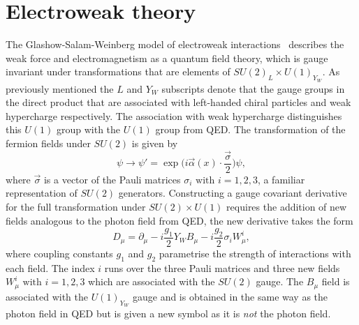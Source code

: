 \section{Electroweak theory}

The Glashow-Salam-Weinberg model of electroweak interactions~\cite{Glashow:1959,
Salam:1959, Weinberg:1967} describes the weak force and electromagnetism as a
quantum field theory, which is gauge invariant under transformations that are
elements of $SU{(2)}_{L} \times U{(1)}_{Y_{W}}$. As previously mentioned the $L$
and $Y_{W}$ subscripts denote that the gauge groups in the direct product that
are associated with left-handed chiral particles and weak hypercharge
respectively. The association with weak hypercharge distinguishes this $U(1)$
group with the $U(1)$ group from QED. The transformation of the fermion fields
under $SU(2)$ is given by
\begin{equation}
  \label{eq:su2-trans} \psi \rightarrow \psi' =
\exp\Big({i\vec{\alpha}(x)\cdot\frac{\vec{\sigma}}{2}}\Big)\psi,
\end{equation} where $\vec{\sigma}$ is a vector of the Pauli matrices
$\sigma_i\text{ with }i=1,2,3$, a familiar representation of $SU(2)$ generators.
Constructing a gauge covariant derivative for the full transformation under
$SU(2) \times U(1)$ requires the addition of new fields analogous to the photon
field from QED, the new derivative takes the form
\begin{equation}
  \label{eq:ew-derivative} D_{\mu} = \partial_{\mu} - i
\frac{g_1}{2}Y_{W}B_{\mu} - i\frac{g_2}{2}\sigma_{i}W_{\mu}^{i},
\end{equation} where coupling constants $g_1$ and $g_2$ parametrise the strength
of interactions with each field. The index $i$ runs over the three Pauli
matrices and three new fields $W^i_{\mu}\text{ with }i=1,2,3$ which are
associated with the $SU(2)$ gauge. The $B_{\mu}$ field is associated with the
$U(1)_{Y_{W}}$ gauge and is obtained in the same way as the photon field in QED
but is given a new symbol as it is \emph{not} the photon field.

